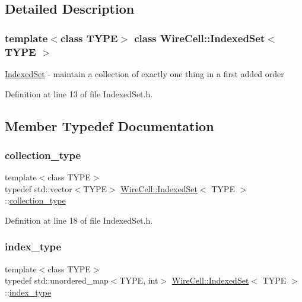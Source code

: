 \subsection{Detailed Description}
\subsubsection*{template$<$class T\+Y\+PE$>$\newline
class Wire\+Cell\+::\+Indexed\+Set$<$ T\+Y\+P\+E $>$}

\hyperlink{class_wire_cell_1_1_indexed_set}{Indexed\+Set} -\/ maintain a collection of exactly one thing in a first added order 

Definition at line 13 of file Indexed\+Set.\+h.



\subsection{Member Typedef Documentation}
\mbox{\label{class_wire_cell_1_1_indexed_set_afd3398c28ed5729c35664d26d6249ed4}} 
\subsubsection{\texorpdfstring{collection\+\_\+type}{collection\_type}}
{\footnotesize\ttfamily template$<$class T\+Y\+PE$>$ \\
typedef std\+::vector$<$T\+Y\+PE$>$ \hyperlink{class_wire_cell_1_1_indexed_set}{Wire\+Cell\+::\+Indexed\+Set}$<$ T\+Y\+PE $>$\+::\hyperlink{class_wire_cell_1_1_indexed_set_afd3398c28ed5729c35664d26d6249ed4}{collection\+\_\+type}}



Definition at line 18 of file Indexed\+Set.\+h.

\mbox{\label{class_wire_cell_1_1_indexed_set_ad9f54ba896d3c199df2cc233f16c5327}} 
\subsubsection{\texorpdfstring{index\+\_\+type}{index\_type}}
{\footnotesize\ttfamily template$<$class T\+Y\+PE$>$ \\
typedef std\+::unordered\+\_\+map$<$T\+Y\+PE, int$>$ \hyperlink{class_wire_cell_1_1_indexed_set}{Wire\+Cell\+::\+Indexed\+Set}$<$ T\+Y\+PE $>$\+::\hyperlink{class_wire_cell_1_1_indexed_set_ad9f54ba896d3c199df2cc233f16c5327}{index\+\_\+type}}



